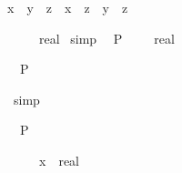 \begin{isabellebody}
\begin{isamarkuptext}
\begin{isabelle}%
{\isacharparenleft}x\ {\isacharplus}\ y{\isacharparenright}\ {\isacharslash}\ z\ {\isacharequal}\ x\ {\isacharslash}\ z\ {\isacharplus}\ y\ {\isacharslash}\ z%
\end{isabelle}
%
\end{isamarkuptext}%
\ {\isachardoublequote}{\isacharhash}{}{\isacharslash}{\isacharhash}{}\ {\isacharless}\ {\isacharparenleft}{\isacharhash}{}{\isacharslash}{\isacharhash}{}\ {\isacharcolon}{\isacharcolon}\ real{\isacharparenright}{\isachardoublequote}\isanewline
{}\ simp\ \isanewline
\isanewline
{}\ {\isachardoublequote}P\ {\isacharparenleft}{\isacharparenleft}{\isacharhash}{}{\isacharslash}{\isacharhash}{}{\isacharparenright}\ {\isacharasterisk}\ {\isacharparenleft}{\isacharhash}{}{\isacharslash}{\isacharhash}{}{}\ {\isacharcolon}{\isacharcolon}\ real{\isacharparenright}{\isacharparenright}{\isachardoublequote}%
\begin{isamarkuptxt}%
\begin{isabelle}%
\ {}{\isachardot}\ P\ {\isacharparenleft}{\isacharhash}{}\ {\isacharslash}\ {\isacharhash}{}\ {\isacharasterisk}\ {\isacharparenleft}{\isacharhash}{}\ {\isacharslash}\ {\isacharhash}{}{}{\isacharparenright}{\isacharparenright}%
\end{isabelle}%
\end{isamarkuptxt}%
\ simp%
\begin{isamarkuptxt}%
\begin{isabelle}%
\ {}{\isachardot}\ P\ {\isacharparenleft}{\isacharhash}{}\ {\isacharslash}\ {\isacharhash}{}{\isacharparenright}%
\end{isabelle}%
\end{isamarkuptxt}%
\isanewline
\isanewline
{}\ {\isachardoublequote}{\isacharparenleft}{\isacharhash}{}{\isacharslash}{\isacharhash}{}{\isacharparenright}\ {\isacharasterisk}\ {\isacharparenleft}{\isacharhash}{}{\isacharslash}{\isacharhash}{}{}{\isacharparenright}\ {\isacharless}\ {\isacharparenleft}x\ {\isacharcolon}{\isacharcolon}\ real{\isacharparenright}{\isachardoublequote}%
\begin{isamarkuptxt}%
\begin{isabelle}%

\end{isabelle}
\end{isamarkuptxt}
\end{isabellebody}
